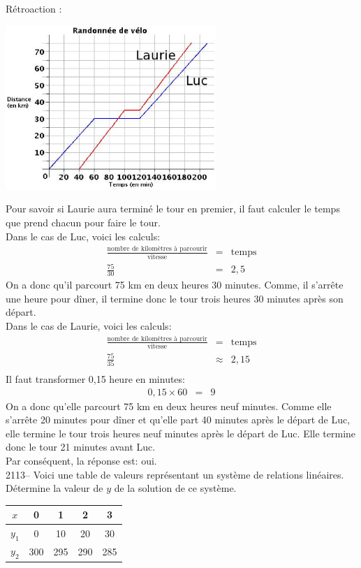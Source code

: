 \documentclass[letterpaper, 12pt]{article}
\begin{document}
R\'etroaction :\\
\begin{center}
 \includegraphics[width=8cm,bb=14 14 573 415]{Q2112.eps}
\end{center}
Pour savoir si Laurie aura termin\'e le tour en premier, il faut calculer le temps que prend chacun pour faire le tour.\\
Dans le cas de Luc, voici les calculs:
\begin{eqnarray*}
\frac{\textrm{nombre de kilom\`etres \`a parcourir}}{\textrm{vitesse}}&=&\textrm{temps}\\
\frac{75}{30}&=&2,5
\end{eqnarray*}
On a donc qu'il parcourt 75 km en deux heures 30 minutes. Comme, il s'arr\^ete une heure pour d\^iner, il termine donc le tour trois heures 30 minutes apr\`es son d\'epart.\\
Dans le cas de Laurie, voici les calculs:
\begin{eqnarray*}
\frac{\textrm{nombre de kilom\`etres \`a parcourir}}{\textrm{vitesse}}&=&\textrm{temps}\\
\frac{75}{35}&\approx&2,15\\
\end{eqnarray*}
Il faut transformer 0,15 heure en minutes:
\begin{eqnarray*}
0,15\times60&=&9
\end{eqnarray*}
On a donc qu'elle parcourt 75 km en deux heures neuf minutes. Comme elle s'arr\^ete 20 minutes pour d\^iner et qu'elle part 40 minutes apr\`es le d\'epart de Luc, elle termine le tour trois heures neuf minutes apr\`es le d\'epart de Luc. Elle termine donc le tour 21 minutes avant Luc.\\
Par cons\'equent, la r\'eponse est: oui.\\

2113-- Voici une table de valeurs repr\'esentant un syst\`eme de relations lin\'eaires. D\'etermine la valeur de $y$ de la solution de ce syst\`eme.
\begin{center}
 \begin{tabular}{|c||c| c | c | c | } \hline
{\bf $x$} & 0 & 1 & 2 & 3  \\ \hline
{\bf $y_{1}$} & 0 & 10 & 20 & 30  \\ \hline
{\bf $y_{2}$} & 300 & 295 & 290 & 285  \\ \hline
\end{tabular}
\end{center}
\end{document}
